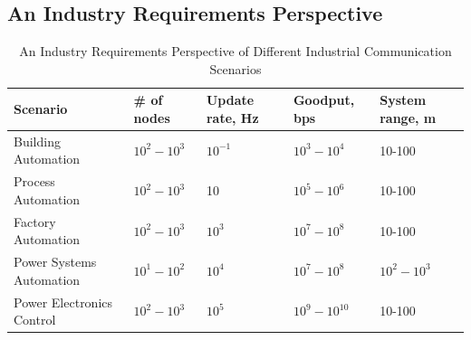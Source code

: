 \subsection{An Industry Requirements Perspective}\label{sec:litreview:industry}

\begin{table}[!tb]
	\centering
	\caption{An Industry Requirements Perspective of Different Industrial Communication Scenarios}
	\label{soa:industry-reqts-persp}%
	
\begin{tabular}{|p{7.5em}|p{4.215em}|p{4.215em}|p{4.215em}|p{4.215em}|}
	\toprule
	\textbf{Scenario} & \textbf{\# of nodes} & \textbf{Update rate, Hz} & \textbf{Goodput, bps} & \textbf{System range, m} \\
	\midrule
	Building Automation & $10^{2}-10^{3}$ & $10^{-1}$ & $10^{3}-10^{4}$ & 10-100 \\
	\midrule
	Process Automation & $10^{2}-10^{3}$ & \multicolumn{1}{l|}{10} & $10^{5}-10^{6}$ & 10-100 \\
	\midrule
	Factory Automation & $10^{2}-10^{3}$ & $10^{3}$ & $10^{7}-10^{8}$ & 10-100 \\
	\midrule
	Power Systems Automation & $10^{1}-10^{2}$ & $10^{4}$ & $10^{7}-10^{8}$ & $10^{2}-10^{3}$ \\
	\midrule
	Power Electronics Control & $10^{2}-10^{3}$ & $10^{5}$ & $10^{9}-10^{10}$ & 10-100 \\
	\bottomrule
\end{tabular}%

	
\end{table}%

